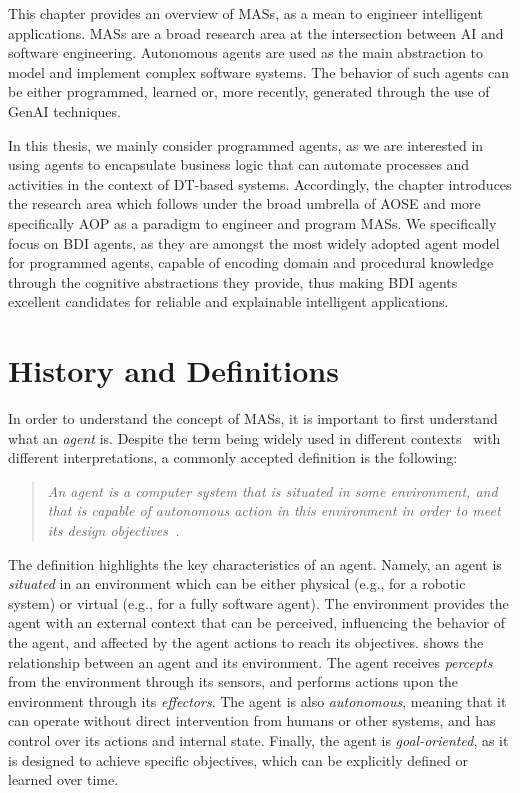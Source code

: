 This chapter provides an overview of \acp{MAS}, as a mean to engineer intelligent applications.
%
\acp{MAS} are a broad research area at the intersection between \ac{AI} and software engineering.
%
Autonomous agents are used as the main abstraction to model and implement complex software systems. The behavior of such agents can be either programmed, learned or, more recently, generated through the use of \ac{GenAI} techniques. 

In this thesis, we mainly consider programmed agents, as we are interested in using agents to encapsulate business logic that can automate processes and activities in the context of \ac{DT}-based systems. 
%
Accordingly, the chapter introduces the research area which follows under the broad umbrella of \ac{AOSE} and more specifically \ac{AOP} as a paradigm to engineer and program \acp{MAS}. 
%
We specifically focus on \ac{BDI} agents, as they are amongst the most widely adopted agent model for programmed agents, capable of encoding domain and procedural knowledge through the cognitive abstractions they provide, thus making \ac{BDI} agents excellent candidates for reliable and explainable intelligent applications. 

\section{History and Definitions}

In order to understand the concept of \acp{MAS}, it is important to first understand what an \emph{agent} is.
%
Despite the term being widely used in different contexts~\cite{wooldridge1995ker} with different interpretations, a commonly accepted definition is the following:

\begin{quote}
\emph{
    An agent is a computer system that is situated in some environment,
    and that is capable of autonomous action in this environment in order
    to meet its design objectives~\cite{2009wooldridge}.
}
\end{quote}

The definition highlights the key characteristics of an agent. 
%
Namely, an agent is \emph{situated} in an environment which can be either physical (e.g., for a robotic system) or virtual (e.g., for a fully software agent).
%
The environment provides the agent with an external context that can be perceived, influencing the behavior of the agent, and affected by the agent actions to reach its objectives.
%
 shows the relationship between an agent and its environment. The agent receives \emph{percepts} from the environment through its sensors, and performs actions upon the environment through its \emph{effectors}.
%
The agent is also \emph{autonomous}, meaning that it can operate without direct intervention from humans or other systems, and has control over its actions and internal state.
%
Finally, the agent is \emph{goal-oriented}, as it is designed to achieve specific objectives, which can be explicitly defined or learned over time.

